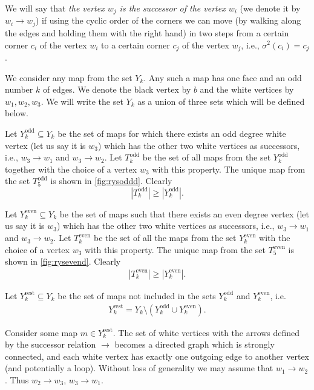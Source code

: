\documentclass[submission]{FPSAC2021}
\DeclareMathOperator{\odd}{odd}
\DeclareMathOperator{\even}{even}
\DeclareMathOperator{\rest}{rest}
\newcommand{\nast}
{
	\sigma
}
\begin{document}
We will say that \emph{the vertex $w_j$ is the successor of the vertex
$w_i$} (we denote it by $w_i \rightarrow w_j$) 
if using the cyclic order of the corners we
can move (by walking along the edges and holding them with the right hand)
in two steps from a certain corner $c_i$ of the vertex $w_i$ to a certain
corner $c_j$ of the vertex $w_j$, i.e., $\nast^2(c_i)=c_j$. 

We consider any map from the set $Y_k$. Any such a map has one
face and an odd number $k$ of edges. We denote the black vertex by $b$
and  the white vertices by $w_1, w_2, w_3$. We will write the set $Y_k$ as
a union of three sets which will be defined below.

Let $Y_{k}^{\odd}\subseteq Y_k$ be the set of maps for which there exists an
odd degree white vertex (let us say it is $w_3$) which has the other two white vertices 
as successors, i.e., $w_3\rightarrow w_1$ and $w_3\rightarrow w_2$.
Let $T_k^{\odd}$ be the set of all maps from the set $Y_k^{\odd}$ 
together with the choice of a vertex $w_3$ with this property. 
The unique map from the set $T_{5}^{\odd}$ is shown in \cref{fig:rysoddd}. Clearly
\begin{equation}
\label{ineqodd}
|T_{k}^{\odd}| \geq |Y_{k}^{\odd}|.
\end{equation}

Let $Y_{k}^{\even}\subseteq Y_k$ be the set of maps such that there
exists an even degree vertex (let us say it is $w_3$) which has the other 
two white vertices as successors, i.e., $w_3\rightarrow w_1$ and $w_3\rightarrow w_2$. 
Let $T_k^{\even}$ be the set of all the maps from the set $Y_k^{\even}$ with the choice 
of a vertex $w_3$ with this property.  
The unique map from the set $T_{5}^{\even}$ is shown in \cref{fig:rysevend}.
Clearly
\begin{align}
\label{ineqeven}
|T_{k}^{\even}| \geq |Y_{k}^{\even}|.
\end{align}

Let $Y_{k}^{\rest}\subseteq Y_k$ be the set of maps not included in the
sets $Y_{k}^{\odd}$ and $Y_{k}^{\even}$, i.e. 
\begin{align}
\label{yrestdef}
Y_{k}^{\rest}=Y_k \setminus (Y_{k}^{\odd} \cup Y_{k}^{\even}).
\end{align}

Consider some map $m\in Y_{k}^{\rest}$. 
The set of white vertices with the arrows defined by the successor relation
$\rightarrow$ becomes a directed graph which is strongly connected, and each
white vertex has exactly one outgoing edge to another vertex (and potentially a
loop). Without  loss  of  generality  we  may  assume  that $w_1 \rightarrow w_2$. Thus $w_2 \rightarrow w_3$, $w_3 \rightarrow w_1$.
\end{document}
